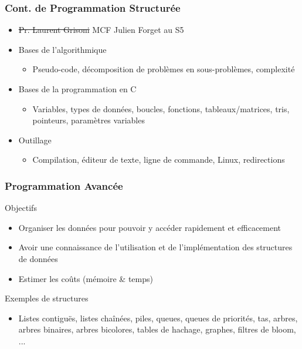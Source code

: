 \documentclass[12pt,svgnames]{beamer}
\begin{document}
\begin{frame}
	\frametitle{Cont. de Programmation Structurée }
	\begin{itemize}
		\item \sout{Pr. Laurent Grisoni} MCF Julien Forget au S5
		\item Bases de l'algorithmique
		\begin{itemize}
			\item Pseudo-code, décomposition de problèmes en sous-problèmes, complexité
		\end{itemize}

		\item Bases de la programmation en C
		\begin{itemize}
			\item Variables, types de données, boucles, fonctions, tableaux/matrices, tris, pointeurs, paramètres variables
		\end{itemize}
		\item Outillage
		\begin{itemize}
			\item Compilation, éditeur de texte, ligne de commande, Linux, redirections
		\end{itemize}
	\end{itemize}
\end{frame}


\begin{frame}
	\frametitle{Programmation Avancée}
	\begin{block}{Objectifs}
		\begin{itemize}
		\item Organiser les données pour pouvoir y accéder rapidement et efficacement
		\item Avoir une connaissance de l'utilisation et de l'implémentation des structures de données
		\item Estimer les coûts (mémoire \& temps)
		\end{itemize}
	\end{block}{}
	\begin{block}{Exemples de structures}
		\begin{itemize}
		\item Listes contiguës, listes chaînées, piles, queues, queues de priorités, tas, arbres, arbres binaires, arbres bicolores, tables de hachage, graphes, filtres de bloom, ...
		\end{itemize}
	\end{block}
\end{frame}
\end{document}
